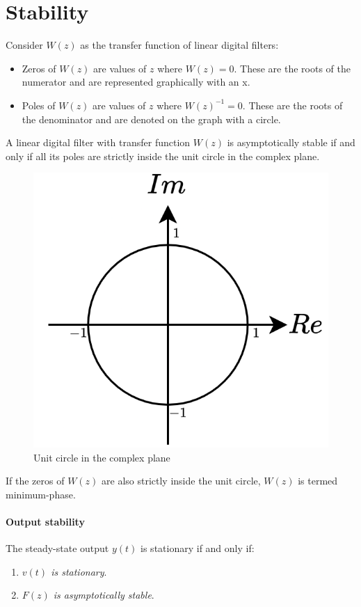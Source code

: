 \section{Stability}

Consider $W(z)$ as the transfer function of linear digital filters:
\begin{itemize}
    \item Zeros of $W(z)$ are values of $z$ where $W(z)=0$. 
        These are the roots of the numerator and are represented graphically with an x.
    \item Poles of $W(z)$ are values of $z$ where $W(z)^{-1}=0$. 
        These are the roots of the denominator and are denoted on the graph with a circle.
\end{itemize}

\begin{theorem}
    A linear digital filter with transfer function $W(z)$ is asymptotically stable if and only if all its poles are strictly inside the unit circle in the complex plane.
\end{theorem}
\begin{figure}[H]
    \centering
    \includegraphics[width=0.3\linewidth]{images/unit.png}
    \caption{Unit circle in the complex plane}
\end{figure}
\begin{definition}
    If the zeros of $W(z)$ are also strictly inside the unit circle, $W(z)$ is termed minimum-phase.
\end{definition}

\paragraph*{Output stability}
\begin{theorem}
    The steady-state output $y(t)$ is stationary if and only if:
\end{theorem}
\begin{enumerate}
    \item \textit{$v(t)$ is stationary}. 
    \item \textit{$F(z)$ is asymptotically stable}. 
\end{enumerate}

